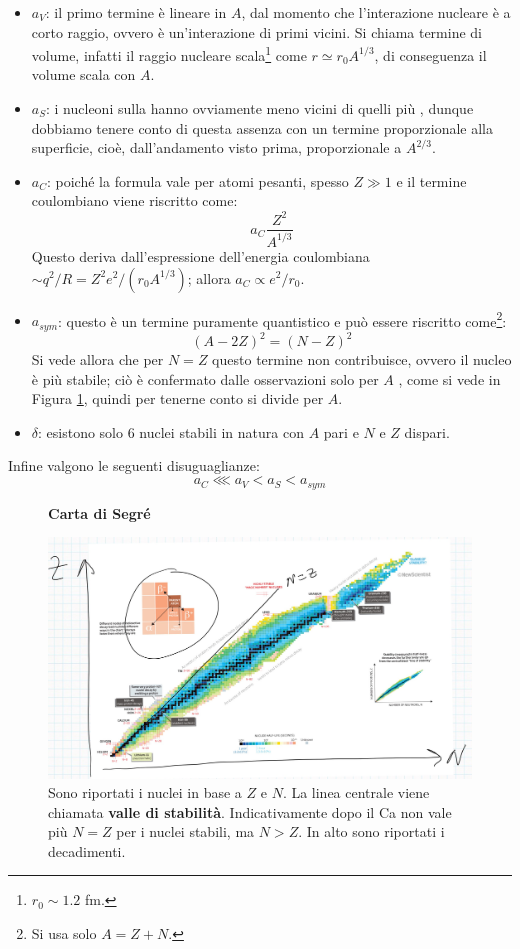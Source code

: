 \begin{itemize}
    \item $a_V$: il primo termine è lineare in $A$, dal momento che l'interazione nucleare è a corto raggio, ovvero è un'interazione di primi vicini. Si chiama termine di volume, infatti il raggio nucleare scala\footnote{$r_0\sim 1.2$ fm.} come $r\simeq r_0 A^{1/3}$, di conseguenza il volume scala con $A$.
    \item $a_S$: i nucleoni sulla  hanno ovviamente meno vicini di quelli più , dunque dobbiamo tenere conto di questa assenza con un termine proporzionale alla superficie, cioè, dall'andamento visto prima, proporzionale a $A^{2/3}$.
    \item $a_C$: poiché la formula vale per atomi pesanti, spesso $Z\gg 1$ e il termine coulombiano viene riscritto come:
    $$a_C \frac{Z^2}{A^{1/3}}$$
    Questo deriva dall'espressione dell'energia coulombiana $\sim q^2/R = Z^2 e^2 / (r_0A^{1/3})$; allora $a_C \propto e^2/r_0$.
    \item $a_{sym}$: questo è un termine puramente quantistico e può essere riscritto come\footnote{Si usa solo $A=Z+N$.}:
    $$(A-2Z)^2 = (N-Z)^2$$
    Si vede allora che per $N=Z$ questo termine non contribuisce, ovvero il nucleo è più stabile; ciò è confermato dalle osservazioni solo per $A$ , come si vede in Figura \ref{segre}, quindi per tenerne conto si divide per $A$.
    \item $\delta$: esistono solo 6 nuclei stabili in natura con $A$ pari e $N$ e $Z$ dispari.
\end{itemize}
\noindent Infine valgono le seguenti disuguaglianze:
$$a_C \lll a_V <a_S < a_{sym}$$

\begin{figure}[h]
    \centering
    \textbf{\Large Carta di Segré}\par\medskip
    \includegraphics[scale=0.21]{Immagini/Segre.png}
    \caption{Sono riportati i nuclei in base a $Z$ e $N$. La linea centrale viene chiamata \textbf{valle di stabilità}. Indicativamente dopo il Ca non vale più $N=Z$ per i nuclei stabili, ma $N>Z$. In alto sono riportati i decadimenti.}
    \label{segre}
\end{figure}

